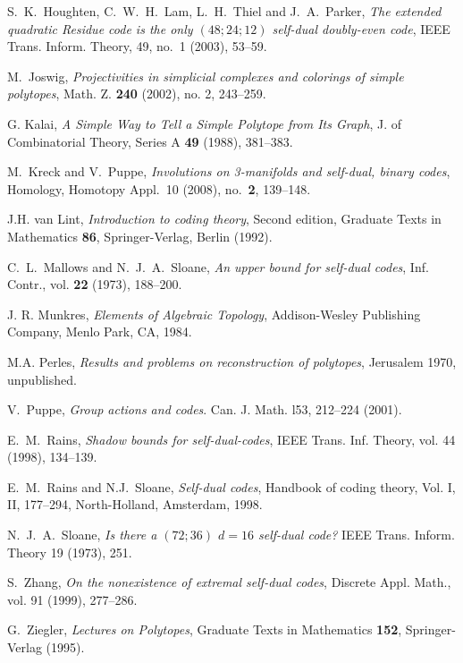 \documentclass[12pt]{amsart}
\theoremstyle{plain} \numberwithin{equation}{section}
\theoremstyle{definition}
\theoremstyle{remark}
\begin{document}
\begin{thebibliography}{99}
S.~K.~Houghten, C.~W.~H.~Lam, L.~H.~Thiel and J.~A.~Parker,
\emph{The extended quadratic Residue code is the only
$(48; 24; 12)$ self-dual doubly-even code},  IEEE Trans. Inform. Theory, 49, no.~1 (2003),
53--59.

  M.~Joswig, \emph{Projectivities in simplicial complexes and colorings of simple polytopes},
  Math. Z. {\bf 240} (2002), no. 2, 243--259.

 G. Kalai, \emph{A Simple Way to Tell a Simple Polytope from Its Graph}, J.
of Combinatorial Theory, Series A {\bf 49} (1988), 381--383.

 M.~Kreck and V.~Puppe,
 \emph{Involutions on 3-manifolds and self-dual, binary codes},
 Homology, Homotopy Appl.~10 (2008), no.~\textbf{2}, 139--148.

  J.H. van Lint,
   \emph{Introduction to coding theory}, Second edition,
    Graduate Texts in Mathematics \textbf{86}, Springer-Verlag, Berlin (1992).
  
  C.~L.~Mallows and N.~J.~A.~Sloane, \emph{An upper bound for self-dual
codes}, Inf. Contr., vol. \textbf{22} (1973), 188--200.
    
 J. R. Munkres, {\em Elements of Algebraic Topology}, Addison-Wesley Publishing Company, Menlo Park, CA, 1984.    
    

M.A. Perles, \emph{Results and problems on reconstruction of polytopes}, Jerusalem
1970, unpublished.

 V.~Puppe,  \emph{Group actions and codes}. Can. J. Math. l53, 212--224
(2001).


E.~M.~Rains, \emph{Shadow bounds for self-dual-codes}, 
 IEEE Trans. Inf. Theory, vol. 44 (1998), 134--139.

  E.~M.~Rains and N.J.~Sloane,
   \emph{Self-dual codes},
   Handbook of coding theory, Vol. I, II, 177--294, North-Holland, Amsterdam, 1998.
   
N.~J.~A.~Sloane, \emph{Is there a $(72; 36)$ $d = 16$ self-dual code?}
  IEEE Trans. Inform. Theory 19 (1973), 251.   

  S.~Zhang, \emph{On the nonexistence of extremal self-dual codes},
   Discrete Appl. Math., vol. 91 (1999), 277--286. 
   
   
 G.~Ziegler, \emph{Lectures on Polytopes}, Graduate Texts in Mathematics \textbf{152},
 Springer-Verlag (1995).

\end{thebibliography}
\end{document}

